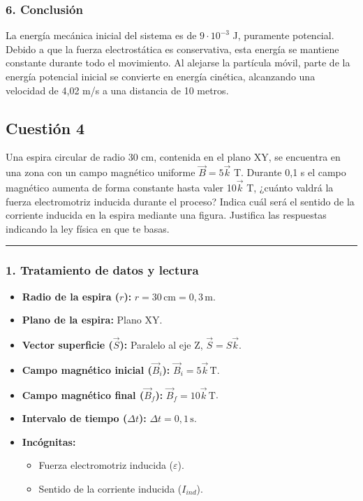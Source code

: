 \subsubsection*{6. Conclusión}
\begin{cajaconclusion}
    La energía mecánica inicial del sistema es de $9 \cdot 10^{-3}$ J, puramente potencial. Debido a que la fuerza electrostática es conservativa, esta energía se mantiene constante durante todo el movimiento. Al alejarse la partícula móvil, parte de la energía potencial inicial se convierte en energía cinética, alcanzando una velocidad de 4,02 m/s a una distancia de 10 metros.
\end{cajaconclusion}
\newpage
\newpage
\subsection{Cuestión 4}
\label{subsec:C4_2024_jul_ext}

\begin{cajaenunciado}
Una espira circular de radio 30 cm, contenida en el plano XY, se encuentra en una zona con un campo magnético uniforme $\vec{B}=5\vec{k}$ T. Durante 0,1 s el campo magnético aumenta de forma constante hasta valer 10$\vec{k}$ T, ¿cuánto valdrá la fuerza electromotriz inducida durante el proceso? Indica cuál será el sentido de la corriente inducida en la espira mediante una figura. Justifica las respuestas indicando la ley física en que te basas.
\end{cajaenunciado}
\hrule

\subsubsection*{1. Tratamiento de datos y lectura}
\begin{itemize}
    \item \textbf{Radio de la espira ($r$):} $r = 30 \, \text{cm} = 0,3 \, \text{m}$.
    \item \textbf{Plano de la espira:} Plano XY.
    \item \textbf{Vector superficie ($\vec{S}$):} Paralelo al eje Z, $\vec{S} = S\vec{k}$.
    \item \textbf{Campo magnético inicial ($\vec{B}_i$):} $\vec{B}_i = 5\vec{k} \, \text{T}$.
    \item \textbf{Campo magnético final ($\vec{B}_f$):} $\vec{B}_f = 10\vec{k} \, \text{T}$.
    \item \textbf{Intervalo de tiempo ($\Delta t$):} $\Delta t = 0,1 \, \text{s}$.
    \item \textbf{Incógnitas:}
    \begin{itemize}
        \item Fuerza electromotriz inducida ($\varepsilon$).
        \item Sentido de la corriente inducida ($I_{ind}$).
    \end{itemize}
\end{itemize}

